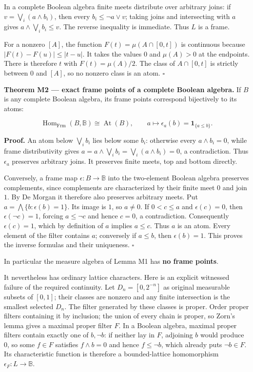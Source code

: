 In a complete Boolean algebra finite meets distribute over arbitrary joins: if \(v=\bigvee_i(a\wedge b_i)\), then every \(b_i\le \neg a\vee v\); taking joins and intersecting with \(a\) gives \(a\wedge\bigvee_i b_i\le v\). The reverse inequality is immediate. Thus \(L\) is a frame.

For a nonzero \([A]\), the function \(F(t)=\mu (A\cap [0,t])\) is continuous because \(|F(t)-F(u)|\le |t-u|\). It takes the values \(0\) and \(\mu(A)>0\) at the endpoints. There is therefore \(t\) with \(F(t)=\mu (A)/2\). The class of \(A\cap [0,t]\) is strictly between \(0\) and \([A]\), so no nonzero class is an atom. \(\square\)

\textbf{Theorem M2 --- exact frame points of a complete Boolean algebra.} If \(B\) is any complete Boolean algebra, its frame points correspond bijectively to its atoms:

\[
\operatorname{Hom}_{\mathrm{Frm}}(B,\mathbb B)
\cong\operatorname{At}(B),\qquad
a\longmapsto\epsilon_a(b)=\mathbf1_{\{a\le b\}}.
\tag{M1}
\]

\textbf{Proof.} An atom below \(\bigvee_i b_i\) lies below some \(b_i\): otherwise every \(a\wedge b_i=0\), while frame distributivity gives \(a=a\wedge\bigvee_i b_i=\bigvee_i(a\wedge b_i)=0\), a contradiction. Thus \(\epsilon _a\) preserves arbitrary joins. It preserves finite meets, top and bottom directly.

Conversely, a frame map \(\epsilon :B\to \mathbb B\) into the two-element Boolean algebra preserves complements, since complements are characterized by their finite meet \(0\) and join \(1\). By De Morgan it therefore also preserves arbitrary meets. Put \(a=\bigwedge\{b:\epsilon(b)=1\}\). Its image is \(1\), so \(a\ne 0\). If \(0<c\le a\) and \(\epsilon (c)=0\), then \(\epsilon (\neg c)=1\), forcing \(a\le \neg c\) and hence \(c=0\), a contradiction. Consequently \(\epsilon (c)=1\), which by definition of \(a\) implies \(a\le c\). Thus \(a\) is an atom. Every element of the filter contains \(a\); conversely if \(a\le b\), then \(\epsilon (b)=1\). This proves the inverse formulas and their uniqueness. \(\square\)

In particular the measure algebra of Lemma M1 has \textbf{no frame points}.

It nevertheless has ordinary lattice characters. Here is an explicit witnessed failure of the required continuity. Let \(D_n=[0,2^{-n}]\) as original measurable subsets of \([0,1]\); their classes are nonzero and any finite intersection is the smallest selected \(D_n\). The filter generated by these classes is proper. Order proper filters containing it by inclusion; the union of every chain is proper, so Zorn's lemma gives a maximal proper filter \(F\). In a Boolean algebra, maximal proper filters contain exactly one of \(b,\neg b\): if neither lay in \(F\), adjoining \(b\) would produce \(0\), so some \(f\in F\) satisfies \(f\wedge b=0\) and hence \(f\le \neg b\), which already puts \(\neg b\in F\). Its characteristic function is therefore a bounded-lattice homomorphism \(\epsilon_F:L\to\mathbb B\).

